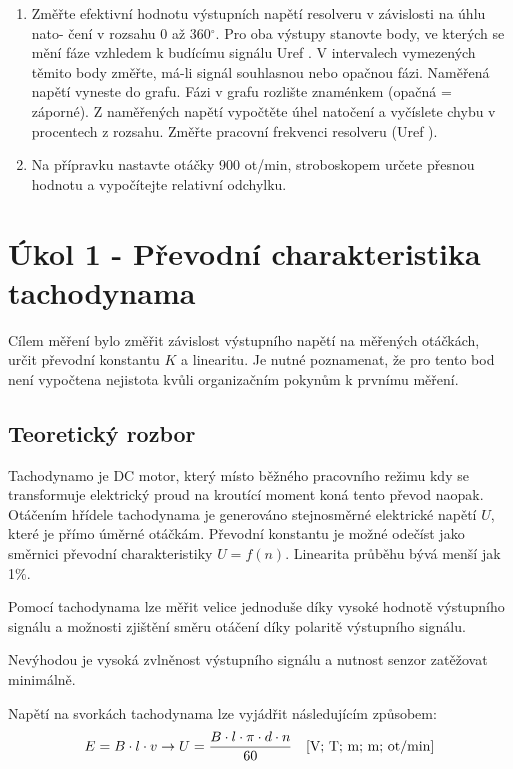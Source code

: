 \documentclass{protokol}
\begin{document}
\begin{enumerate}
        \item   Změřte efektivní hodnotu výstupních napětí resolveru v závislosti na úhlu nato-
                čení v rozsahu 0 až 360$^\circ$. Pro oba výstupy stanovte body, ve kterých se mění fáze
                vzhledem k budícímu signálu Uref . V intervalech vymezených těmito body změřte,
                má-li signál souhlasnou nebo opačnou fázi. Naměřená napětí vyneste do grafu. Fázi
                v grafu rozlište znaménkem (opačná = záporné). Z naměřených napětí vypočtěte
                úhel natočení a vyčíslete chybu v procentech z rozsahu. Změřte pracovní frekvenci
                resolveru (Uref ).

        \item   Na přípravku nastavte otáčky 900 ot/min, stroboskopem určete přesnou hodnotu a
                vypočítejte relativní odchylku.
    \end{enumerate}

\section{Úkol 1 - Převodní charakteristika tachodynama}
    Cílem měření bylo změřit závislost výstupního napětí na měřených otáčkách, určit převodní konstantu $K$ a linearitu. Je nutné poznamenat, 
    že pro tento bod není vypočtena nejistota kvůli organizačním pokynům k prvnímu měření. 
    \subsection{Teoretický rozbor}
    Tachodynamo je DC motor, který místo běžného pracovního režimu kdy se transformuje elektrický proud na kroutící moment koná tento převod naopak.
    Otáčením hřídele tachodynama je generováno stejnosměrné elektrické napětí $U$, které je přímo úměrné otáčkám. Převodní konstantu je možné
    odečíst jako směrnici převodní charakteristiky $U = f(n)$. Linearita průběhu bývá menší jak 1$\%$\cite{navod}.

    Pomocí tachodynama lze měřit velice jednoduše díky vysoké hodnotě výstupního signálu a možnosti zjištění směru otáčení díky polaritě výstupního signálu. 
    
    Nevýhodou je vysoká zvlněnost výstupního signálu a nutnost senzor zatěžovat minimálně. 

    Napětí na svorkách tachodynama lze vyjádřit následujícím způsobem:
    \begin{equation}
        E = B \cdot l \cdot v \rightarrow U = \dfrac{B \cdot l \cdot \pi \cdot d \cdot n}{60} \text{\quad [V; T; m; m; ot/min]}
    \end{equation}  
    
\end{document}
